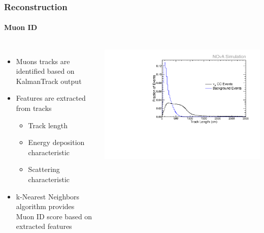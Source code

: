\documentclass[10pt,professionalfonts,xcolor=table]{beamer}
\begin{document}
\begin{frame}

\frametitle{Reconstruction}
\framesubtitle{Muon ID}
\begin{columns}[c]
  \begin{itemize}
  \item Muons tracks are identified based on KalmanTrack output
  \gap
  \item Features are extracted from tracks
    \begin{itemize}
    \item Track length
    \item Energy deposition characteristic
    \item Scattering characteristic
    \end{itemize}
  \gap
  \item k-Nearest Neighbors algorithm provides Muon ID score based on extracted features

  \end{itemize}

\centering

\includegraphics[height=\textwidth, angle=-90]{figures/plots/reco/remid_trk_len.pdf}


\end{columns}
\end{frame}
\end{document}
